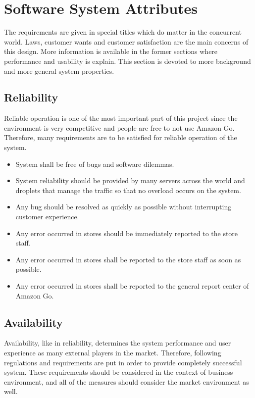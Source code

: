 \section{Software System Attributes}
The requirements are given in special titles which do matter in the concurrent world. Laws, customer wants and customer satisfaction are the main concerns of this design. More information is available in the former sections where performance and usability is explain. This section is devoted to more background and more general system properties.

\subsection{Reliability}
Reliable operation is one of the most important part of this project since the environment is very competitive and people are free to not use Amazon Go. Therefore, many requirements are to be satisfied for reliable operation of the system.

\begin{itemize}
    \item System shall be free of bugs and software dilemmas.
    \item System reliability should be provided by many servers across the world and droplets that manage the traffic so that no overload occurs on the system.
    \item Any bug should be resolved as quickly as possible without interrupting customer experience. 
    \item Any error occurred in stores should be immediately reported to the store staff.
    \item Any error occurred in stores shall be reported to the store staff as soon as possible.
    \item Any error occurred in stores shall be reported to the general report center of Amazon Go.
\end{itemize}


\subsection{Availability}
Availability, like in reliability, determines the system performance and user experience as many external players in the market. Therefore, following regulations and requirements are put in order to provide completely successful system. These requirements should be considered in the context of business environment, and all of the measures should consider the market environment as well.

